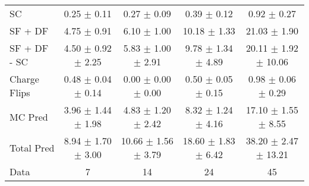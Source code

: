 \begin{tabular}{l|cccc}
                                 SC &  0.25 $\pm$  0.11 &  0.27 $\pm$  0.09 &  0.39 $\pm$  0.12 &  0.92 $\pm$  0.27 \\
                            SF + DF &  4.75 $\pm$  0.91 &  6.10 $\pm$  1.00 & 10.18 $\pm$  1.33 & 21.03 $\pm$  1.90 \\
\hline
                       SF + DF - SC &  4.50 $\pm$  0.92 $\pm$  2.25 &  5.83 $\pm$  1.00 $\pm$  2.91 &  9.78 $\pm$  1.34 $\pm$  4.89 & 20.11 $\pm$  1.92 $\pm$ 10.06 \\
\hline\hline
                       Charge Flips &  0.48 $\pm$  0.04 $\pm$  0.14 &  0.00 $\pm$  0.00 $\pm$  0.00 &  0.50 $\pm$  0.05 $\pm$  0.15 &  0.98 $\pm$  0.06 $\pm$  0.29 \\
\hline
                            MC Pred &  3.96 $\pm$  1.44 $\pm$  1.98 &  4.83 $\pm$  1.20 $\pm$  2.42 &  8.32 $\pm$  1.24 $\pm$  4.16 & 17.10 $\pm$  1.55 $\pm$  8.55 \\
\hline
                         Total Pred &  8.94 $\pm$  1.70 $\pm$  3.00 & 10.66 $\pm$  1.56 $\pm$  3.79 & 18.60 $\pm$  1.83 $\pm$  6.42 & 38.20 $\pm$  2.47 $\pm$ 13.21 \\
\hline\hline
                               Data &     7 &    14 &    24 &    45 \\
\hline\hline
\end{tabular}


